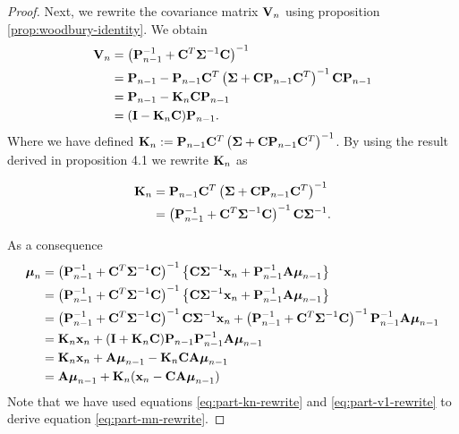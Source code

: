 \documentclass[11pt]{article}
\numberwithin{equation}{section}
\newcommand{\x}{{\bf x}}
\begin{document}
\begin{proof}
	Next, we rewrite the covariance matrix ${\bf V}_n$ using proposition \ref{prop:woodbury-identity}. We obtain
	\begin{align}
		{\bf V}_n &= \left({\bf P}_{n-1}^{-1} + {\bf C}^T \boldsymbol\Sigma^{-1}{\bf C}\right)^{-1} \\
				  &= {\bf P}_{n-1} - {\bf P}_{n-1} {\bf C}^T\left(\boldsymbol\Sigma + {\bf C}{\bf P}_{n-1}{\bf C}^T\right)^{-1}{\bf C}{\bf P}_{n-1} \\
				  &= {\bf P}_{n-1} - {\bf K}_n{\bf C}{\bf P}_{n-1} \\
				  &= ({\bf I}- {\bf K}_n{\bf C}){\bf P}_{n-1}.
	\end{align}
	Where we have defined ${\bf K}_n := {\bf P}_{n-1} {\bf C}^T\left(\boldsymbol\Sigma + {\bf C}{\bf P}_{n-1}{\bf C}^T\right)^{-1}$. By using the result derived in proposition 4.1 we rewrite ${\bf K}_n$ as
	
	\begin{align}
		{\bf K}_n &= {\bf P}_{n-1} {\bf C}^T\left(\boldsymbol\Sigma + {\bf C}{\bf P}_{n-1}{\bf C}^T\right)^{-1} \\
				  &= \left({\bf P}_{n-1}^{-1} + {\bf C}^T\boldsymbol\Sigma^{-1}{\bf C}\right)^{-1}{\bf C}\boldsymbol\Sigma^{-1}. \label{eq:part-kn-rewrite}
	\end{align}
	
	As a consequence
	\begin{align}
		\boldsymbol{\mu}_n &= \left({\bf P}_{n-1}^{-1} + {\bf C}^T \boldsymbol\Sigma^{-1}{\bf C}\right)^{-1} \left\{{\bf C}\boldsymbol\Sigma^{-1}\x_n + {\bf P}_{n-1}^{-1}{\bf A}\boldsymbol\mu_{n-1}\right\}\\
		&= \left({\bf P}_{n-1}^{-1} + {\bf C}^T \boldsymbol\Sigma^{-1}{\bf C}\right)^{-1} \left\{{\bf C}\boldsymbol\Sigma^{-1}\x_n + {\bf P}_{n-1}^{-1}{\bf A}\boldsymbol\mu_{n-1}\right\}\\
		&= \left({\bf P}_{n-1}^{-1} + {\bf C}^T \boldsymbol\Sigma^{-1}{\bf C}\right)^{-1} {\bf C}\boldsymbol\Sigma^{-1}\x_n + \left({\bf P}_{n-1}^{-1} + {\bf C}^T \boldsymbol\Sigma^{-1}{\bf C}\right)^{-1}{\bf P}_{n-1}^{-1}{\bf A}\boldsymbol\mu_{n-1}\\
		&= 	{\bf K}_n \x_n + ({\bf I} + {\bf K}_n {\bf C}){\bf P}_{n-1}{\bf P}_{n-1}^{-1}{\bf A}\boldsymbol\mu_{n-1} \label{eq:part-mn-rewrite}\\
		&= {\bf K}_n \x_n + {\bf A}\boldsymbol\mu_{n-1} - {\bf K}_n {\bf C}{\bf A}\boldsymbol\mu_{n-1}\\
		&= {\bf A}\boldsymbol{\mu}_{n-1} + {\bf K}_{n}(\x_n - {\bf CA}\boldsymbol\mu_{n-1})
	\end{align}
	Note that we have used equations \eqref{eq:part-kn-rewrite} and \eqref{eq:part-v1-rewrite} to derive equation \eqref{eq:part-mn-rewrite}.
	

\end{proof}
\end{document}

